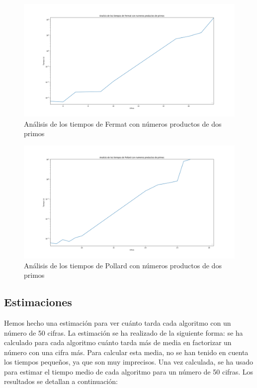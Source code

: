 \documentclass{article}
\begin{document}
    \begin{figure}[ht!]
        \centering
        \includegraphics[width=\linewidth]{Figure_4}
        \caption{Análisis de los tiempos de Fermat con números productos de dos primos}
        \label{fig:Figure_4}
    \end{figure}

    \begin{figure}[ht!]
        \centering
        \includegraphics[width=\linewidth]{Figure_6}
        \caption{Análisis de los tiempos de Pollard con números productos de dos primos}
        \label{fig:Figure_6}
    \end{figure}
 \newpage
 
\subsection*{Estimaciones}
    Hemos hecho una  estimación para ver cuánto tarda cada algoritmo con un número de 50 cifras. La estimación se ha realizado de la siguiente forma: se ha calculado para cada algoritmo cuánto tarda más de media en factorizar un número con una cifra más. Para calcular esta media, no se han tenido en cuenta los tiempos pequeños, ya que son muy imprecisos. Una vez calculada, se ha usado para estimar el tiempo medio de cada algoritmo para un número de 50 cifras. Los resultados se detallan a continuación:
    
\end{document}
